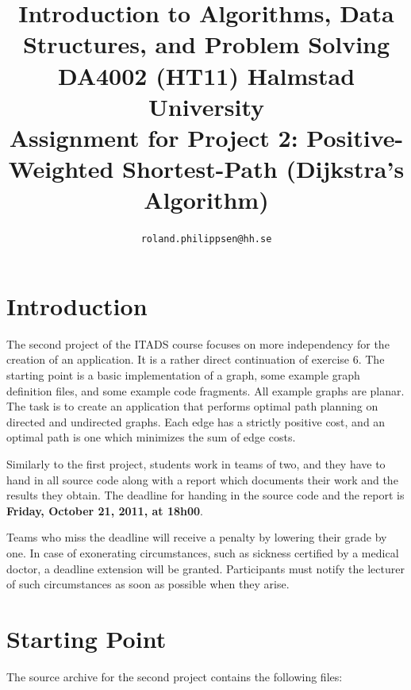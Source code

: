 \documentclass[a4paper,10pt]{article}
\begin{document}
\title{
  {\normalsize
    Introduction to Algorithms, Data Structures, and Problem Solving\\
    DA4002 (HT11) Halmstad University}\\
  Assignment for Project 2: Positive-Weighted Shortest-Path (Dijkstra's Algorithm)
}
\author{
  \texttt{roland.philippsen@hh.se}
}
\maketitle



\section{Introduction}

The second project of the ITADS course focuses on more independency for the creation of an application.
It is a rather direct continuation of exercise 6.
The starting point is a basic implementation of a graph, some example graph definition files, and some example code fragments.
All example graphs are planar.
The task is to create an application that performs optimal path planning on directed and undirected graphs.
Each edge has a strictly positive cost, and an optimal path is one which minimizes the sum of edge costs.

Similarly to the first project, students work in teams of two, and they have to hand in all source code along with a report which documents their work and the results they obtain.
The deadline for handing in the source code and the report is \textbf{Friday, October 21, 2011, at 18h00}.

Teams who miss the deadline will receive a penalty by lowering their grade by one.
In case of exonerating circumstances, such as sickness certified by a medical doctor, a deadline extension will be granted.
Participants must notify the lecturer of such circumstances as soon as possible when they arise.



\section{Starting Point}

The source archive for the second project contains the following files:
\end{document}
